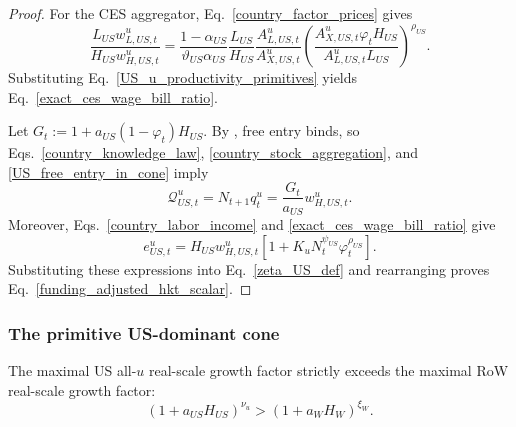 \documentclass{article}
\def\green#1{#1}%
\begin{document}
\begin{proof}
\green{For the CES aggregator}, \green{Eq}.~\green{\eqref{country_factor_prices} gives}
\[
\frac{\green{L}_{\green{US}}\green{w}_{\green{L},\green{US},\green{t}}^\green{u}}{\green{H}_{\green{US}}\green{w}_{\green{H},\green{US},\green{t}}^\green{u}}
\green{=}
\frac{\green{1-\alpha}_{\green{US}}}{\green{\vartheta}_{\green{US}}\green{\alpha}_{\green{US}}}
\frac{\green{L}_{\green{US}}}{\green{H}_{\green{US}}}
\frac{\green{A}_{\green{L},\green{US},\green{t}}^\green{u}}{\green{A}_{\green{X},\green{US},\green{t}}^\green{u}}
\left(
\frac{\green{A}_{\green{X},\green{US},\green{t}}^\green{u\varphi}_\green{tH}_{\green{US}}}
     {\green{A}_{\green{L},\green{US},\green{t}}^\green{uL}_{\green{US}}}
\right)^{\green{\rho}_{\green{US}}}.
\]
\green{Substituting Eq}.~\green{\eqref{US_u_productivity_primitives} yields Eq}.~\green{\eqref{exact_ces_wage_bill_ratio}}.

\green{Let} $\green{G}_\green{t}:\green{=1+a}_{\green{US}}(\green{1-\varphi}_\green{t})\green{H}_{\green{US}}$.  \green{By }, \green{free entry binds}, \green{so Eqs}.~\green{\eqref{country_knowledge_law}}, \green{\eqref{country_stock_aggregation}}, \green{and \eqref{US_free_entry_in_cone} imply}
\[
\green{\mathcal Q}_{\green{US},\green{t}}^\green{u}
\green{=N}_{\green{t+1}}\green{q}_\green{t}^\green{u}
\green{=}\frac{\green{G}_\green{t}}{\green{a}_{\green{US}}}\green{w}_{\green{H},\green{US},\green{t}}^\green{u}.
\]
\green{Moreover}, \green{Eqs}.~\green{\eqref{country_labor_income} and \eqref{exact_ces_wage_bill_ratio} give}
\[
\green{e}_{\green{US},\green{t}}^\green{u}
\green{=H}_{\green{US}}\green{w}_{\green{H},\green{US},\green{t}}^\green{u}
\left[\green{1+K}_\green{uN}_\green{t}^{\green{\psi}_{\green{US}}}\green{\varphi}_\green{t}^{\green{\rho}_{\green{US}}}\right].
\]
\green{Substituting these expressions into Eq}.~\green{\eqref{zeta_US_def} and rearranging proves Eq}.~\green{\eqref{funding_adjusted_hkt_scalar}}.
\end{proof}

\subsubsection{The \green{primitive US-dominant} cone}

\begin{ass}\label{ass_hkt_growth_dominance}
The maximal US all-$u$ real-scale growth factor strictly exceeds the maximal RoW real-scale growth factor:
\begin{equation}\label{hkt_growth_dominance}
\boxed{
(1+a_{US}H_{US})^{\nu_u}
>
(1+a_WH_W)^{\xi_W}.
}
\end{equation}
\end{ass}
\end{document}

